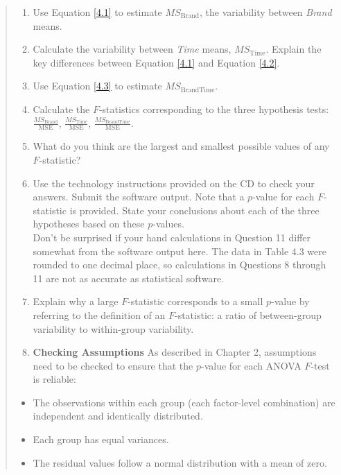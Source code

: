 \documentclass[
]{report}
\providecommand{\tightlist}{%
  \setlength{\itemsep}{0pt}\setlength{\parskip}{0pt}}
\begin{document}
\begin{quote}
\begin{enumerate}
\def\labelenumi{\arabic{enumi}.}
\setcounter{enumi}{7}
\tightlist
\item
  Use Equation \ref{4.1} to estimate \(MS_{\text{Brand}}\), the variability between \emph{Brand} means.\\
\item
  Calculate the variability between \emph{Time} means, \(MS_{\text{Time}}\). Explain the key differences between Equation \ref{4.1} and Equation \ref{4.2}.\\
\item
  Use Equation \ref{4.3} to estimate \(MS_{\text{BrandTime}}\).\\
\item
  Calculate the \(F\)-statistics corresponding to the three hypothesis tests: \(\frac{MS_{\text{Brand}}}{\text{MSE}}\), \(\frac{MS_{\text{Time}}}{\text{MSE}}\), \(\frac{MS_{\text{BrandTime}}}{\text{MSE}}\).\\
\item
  What do you think are the largest and smallest possible values of any \(F\)-statistic?\\
\item
  Use the technology instructions provided on the CD to check your answers. Submit the software output. Note that a \(p\)-value for each \(F\)-statistic is provided. State your conclusions about each of the three hypotheses based on these \(p\)-values.\\
  Don't be surprised if your hand calculations in Question 11 differ somewhat from the software output here. The data in Table 4.3 were rounded to one decimal place, so calculations in Questions 8 through 11 are not as accurate as statistical software.\\
\item
  Explain why a large \(F\)-statistic corresponds to a small \(p\)-value by referring to the definition of an \(F\)-statistic: a ratio of between-group variability to within-group variability.\\
\item
  \textbf{Checking Assumptions} As described in Chapter 2, assumptions need to be checked to ensure that the \(p\)-value for each ANOVA \(F\)-test is reliable:
\end{enumerate}

\begin{itemize}
\tightlist
\item
  The observations within each group (each factor-level combination) are independent and identically distributed.
\item
  Each group has equal variances.
\item
  The residual values follow a normal distribution with a mean of zero.
\end{itemize}


\end{quote}
\end{document}
